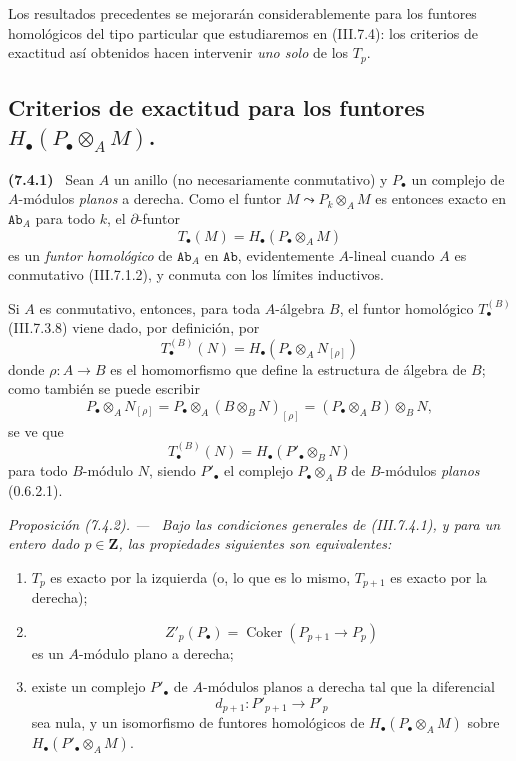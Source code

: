 \documentclass[10pt,oneside]{book}
\newcommand{\bb}[1]{\mathbf{#1}}
\newcommand{\cat}[1]{\mathtt{#1}}
\newcommand{\Coker}{\operatorname{Coker}}
\newcommand{\sref}[2][]{\textup{(#2)}}
\newcommand{\oldpage}[2][]{\setcounter{footnote}{0}\marginpar{\scriptsize\textbf{#1}~|~#2}\ignorespaces}
\newenvironment{env}[1][]{\par\medskip\noindent\textbf{(#1)}\ }{\par}
\newenvironment{proposition}[1][]{\par\medskip\noindent\itshape Proposición (#1). ---\ }{\par}
\begin{document}
Los resultados precedentes se mejorarán considerablemente para los
funtores homológicos del tipo particular que estudiaremos en
\sref{III.7.4}: los criterios de exactitud así obtenidos hacen
intervenir \emph{uno solo} de los $T_p$.

\subsection{\texorpdfstring{Criterios de exactitud para los funtores
$H_\bullet(P_\bullet\otimes_A M)$.}{Criterios de exactitud para los funtores H.(P. tensor M)}}
\label{subsection:III.7.4}
\label{III.7.4}

\begin{env}[7.4.1]
\label{III.7.4.1}
Sean $A$ un anillo (no necesariamente conmutativo) y $P_\bullet$ un complejo
de $A$-módulos \emph{planos} a derecha. Como el funtor
$M\leadsto P_k\otimes_A M$ es entonces exacto en $\cat{Ab}_A$ para todo $k$,
el $\partial$-funtor
\[
  T_\bullet(M)=H_\bullet(P_\bullet\otimes_A M)
  \tag{7.4.1.1}\label{III.7.4.1.1.eq}
\]
\oldpage[III]{186}
es un \emph{funtor homológico} de $\cat{Ab}_A$ en $\cat{Ab}$,
evidentemente $A$-lineal cuando $A$ es conmutativo
\sref{III.7.1.2}, y conmuta con los límites inductivos.

Si $A$ es conmutativo, entonces, para toda $A$-álgebra $B$, el funtor
homológico $T_\bullet^{(B)}$ \sref{III.7.3.8} viene dado, por definición, por
\[
  T_\bullet^{(B)}(N)
  =
  H_\bullet(P_\bullet\otimes_A N_{[\rho]})
  \tag{7.4.1.2}\label{III.7.4.1.2.eq}
\]
donde $\rho:A\to B$ es el homomorfismo que define la estructura de álgebra de
$B$; como también se puede escribir
\[
  P_\bullet\otimes_A N_{[\rho]}
  =P_\bullet\otimes_A(B\otimes_B N)_{[\rho]}
  =(P_\bullet\otimes_A B)\otimes_B N,
\]
se ve que
\[
  T_\bullet^{(B)}(N)=H_\bullet(P'_\bullet\otimes_B N)
  \tag{7.4.1.3}\label{III.7.4.1.3.eq}
\]
para todo $B$-módulo $N$, siendo $P'_\bullet$ el complejo
$P_\bullet\otimes_A B$ de $B$-módulos \emph{planos}
\sref[0]{0.6.2.1}.
\end{env}

\begin{proposition}[7.4.2]
\label{III.7.4.2}
Bajo las condiciones generales de \sref{III.7.4.1}, y para un entero dado
$p\in\bb Z$, las propiedades siguientes son equivalentes:
\begin{enumerate}
  \item[(a)] $T_p$ es exacto por la izquierda \textup{(o, lo que es lo mismo,}
    $T_{p+1}$ es exacto por la derecha);
  \item[(b)]
    \[
      Z'_p(P_\bullet)
      =
      \Coker(P_{p+1}\longrightarrow P_p)
    \]
    es un $A$-módulo plano a derecha;
  \item[(c)] existe un complejo $P'_\bullet$ de $A$-módulos planos a derecha
    tal que la diferencial
    \[
      d_{p+1}:P'_{p+1}\longrightarrow P'_p
    \]
    sea nula, y un isomorfismo de funtores homológicos de
    $H_\bullet(P_\bullet\otimes_A M)$ sobre
    $H_\bullet(P'_\bullet\otimes_A M)$.
\end{enumerate}
\end{proposition}
\end{document}
